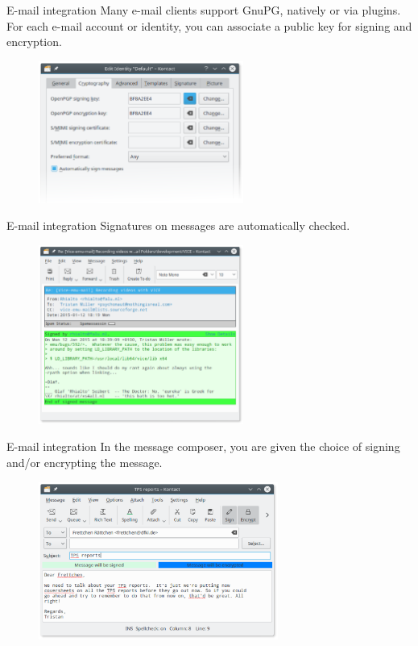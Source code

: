 \documentclass[
mode=present,
paper=smartboard,
size=20pt,
]{powerdot}
\begin{document}
\begin{slide}{E-mail integration}
  Many e-mail clients support GnuPG, natively or via plugins.  For
  each e-mail account or identity, you can associate a public key for
  signing and encryption.
  \begin{figure}[H]
    \centering
    \includegraphics[width=0.6\textwidth]{images/kmail_conf.eps}
    \label{fig:kmail_conf}
  \end{figure}
\end{slide}

\begin{slide}[toc=]{E-mail integration}
  Signatures on messages are automatically checked.
  \begin{figure}[H]
    \centering
    \includegraphics[width=0.6\textwidth]{images/kmail_recvd.eps}
    \label{fig:kmail_recvd}
  \end{figure}
\end{slide}

\begin{slide}[toc=]{E-mail integration}
  In the message composer, you are given the choice of signing and/or
  encrypting the message.
  \begin{figure}[H]
    \centering
    \includegraphics[width=0.7\textwidth]{images/kmail_send.eps}
    \label{fig:kmail_send}
  \end{figure}
\end{slide}
\end{document}
